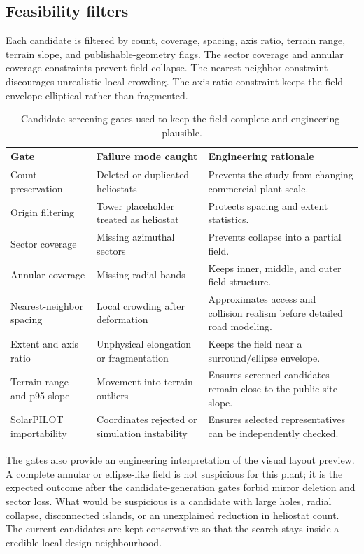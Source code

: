 \documentclass[final,3p,times]{elsarticle}
\begin{document}
\subsection{Feasibility filters}
Each candidate is filtered by count, coverage, spacing, axis ratio, terrain range, terrain slope, and publishable-geometry flags. The sector coverage and annular coverage constraints prevent field collapse. The nearest-neighbor constraint discourages unrealistic local crowding. The axis-ratio constraint keeps the field envelope elliptical rather than fragmented.

\begin{table}[t]
\centering
\caption{Candidate-screening gates used to keep the field complete and engineering-plausible.}
\label{tab:gates}
\small
\begin{tabular}{p{}p{}p{}}
\toprule
Gate & Failure mode caught & Engineering rationale \\
\midrule
Count preservation & Deleted or duplicated heliostats & Prevents the study from changing commercial plant scale. \\
Origin filtering & Tower placeholder treated as heliostat & Protects spacing and extent statistics. \\
Sector coverage & Missing azimuthal sectors & Prevents collapse into a partial field. \\
Annular coverage & Missing radial bands & Keeps inner, middle, and outer field structure. \\
Nearest-neighbor spacing & Local crowding after deformation & Approximates access and collision realism before detailed road modeling. \\
Extent and axis ratio & Unphysical elongation or fragmentation & Keeps the field near a surround/ellipse envelope. \\
Terrain range and p95 slope & Movement into terrain outliers & Ensures screened candidates remain close to the public site slope. \\
SolarPILOT importability & Coordinates rejected or simulation instability & Ensures selected representatives can be independently checked. \\
\bottomrule
\end{tabular}
\end{table}

The gates also provide an engineering interpretation of the visual layout preview. A complete annular or ellipse-like field is not suspicious for this plant; it is the expected outcome after the candidate-generation gates forbid mirror deletion and sector loss. What would be suspicious is a candidate with large holes, radial collapse, disconnected islands, or an unexplained reduction in heliostat count. The current candidates are kept conservative so that the search stays inside a credible local design neighbourhood.
\end{document}
